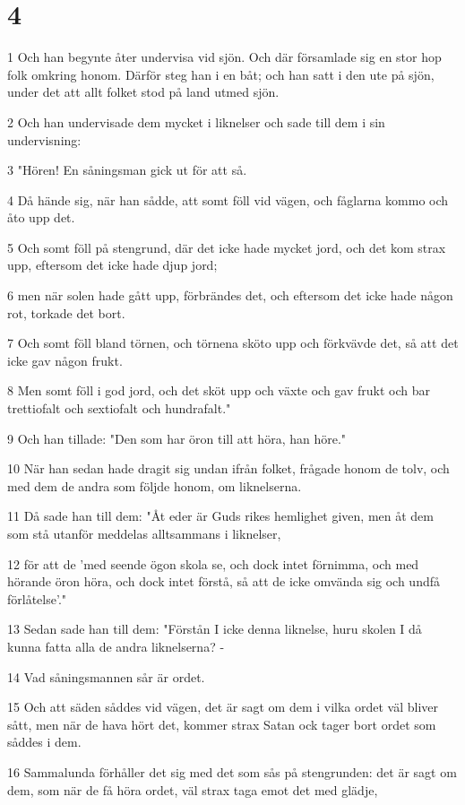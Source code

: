 \chapter{4}

\par 1 Och han begynte åter undervisa vid sjön. Och där församlade sig en stor hop folk omkring honom. Därför steg han i en båt; och han satt i den ute på sjön, under det att allt folket stod på land utmed sjön.
\par 2 Och han undervisade dem mycket i liknelser och sade till dem i sin undervisning:
\par 3 "Hören! En såningsman gick ut för att så.
\par 4 Då hände sig, när han sådde, att somt föll vid vägen, och fåglarna kommo och åto upp det.
\par 5 Och somt föll på stengrund, där det icke hade mycket jord, och det kom strax upp, eftersom det icke hade djup jord;
\par 6 men när solen hade gått upp, förbrändes det, och eftersom det icke hade någon rot, torkade det bort.
\par 7 Och somt föll bland törnen, och törnena sköto upp och förkvävde det, så att det icke gav någon frukt.
\par 8 Men somt föll i god jord, och det sköt upp och växte och gav frukt och bar trettiofalt och sextiofalt och hundrafalt."
\par 9 Och han tillade: "Den som har öron till att höra, han höre."
\par 10 När han sedan hade dragit sig undan ifrån folket, frågade honom de tolv, och med dem de andra som följde honom, om liknelserna.
\par 11 Då sade han till dem: "Åt eder är Guds rikes hemlighet given, men åt dem som stå utanför meddelas alltsammans i liknelser,
\par 12 för att de 'med seende ögon skola se, och dock intet förnimma, och med hörande öron höra, och dock intet förstå, så att de icke omvända sig och undfå förlåtelse'."
\par 13 Sedan sade han till dem: "Förstån I icke denna liknelse, huru skolen I då kunna fatta alla de andra liknelserna? -
\par 14 Vad såningsmannen sår är ordet.
\par 15 Och att säden såddes vid vägen, det är sagt om dem i vilka ordet väl bliver sått, men när de hava hört det, kommer strax Satan ock tager bort ordet som såddes i dem.
\par 16 Sammalunda förhåller det sig med det som sås på stengrunden: det är sagt om dem, som när de få höra ordet, väl strax taga emot det med glädje,
